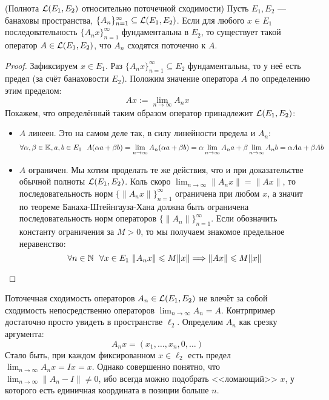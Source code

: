 \begin{theorem} (Полнота $\mathcal{L}(E_1, E_2)$ относительно поточечной сходимости)
	Пусть $E_1, E_2$ --- банаховы пространства, $\{A_n\}_{n = 1}^\infty \subseteq \mathcal{L}(E_1, E_2)$. Если для любого $x \in E_1$ последовательность $\{A_nx\}_{n = 1}^\infty$ фундаментальна в $E_2$, то существует такой оператор $A \in \mathcal{L}(E_1, E_2)$, что $A_n$ сходятся поточечно к $A$.
\end{theorem}

\begin{proof}
	Зафиксируем $x \in E_1$. Раз $\{A_nx\}_{n = 1}^\infty \subseteq E_2$ фундаментальна, то у неё есть предел (за счёт банаховости $E_2$). Положим значение оператора $A$ по определению этим пределом:
	\[
		Ax := \lim_{n \to \infty} A_nx
	\]
	Покажем, что определённый таким образом оператор принадлежит $\mathcal{L}(E_1, E_2)$:
	\begin{itemize}
		\item $A$ линеен. Это на самом деле так, в силу линейности предела и $A_n$:
		\[
			\forall \alpha, \beta \in \K, a, b \in E_1\ \ A(\alpha a + \beta b) = \lim_{n \to \infty} A_n(\alpha a + \beta b) = \alpha \lim_{n \to \infty} A_na + \beta \lim_{n \to \infty} A_nb = \alpha Aa + \beta Ab
		\]
		
		\item $A$ ограничен. Мы хотим проделать те же действия, что и при доказательстве обычной полноты $\mathcal{L}(E_1, E_2)$. Коль скоро $\lim_{n \to \infty} \|A_nx\| = \|Ax\|$, то последовательность норм $\{\|A_nx\|\}_{n = 1}^\infty$ ограничена при любом $x$, а значит по теореме Банаха-Штейнгауза-Хана должна быть ограничена последовательность норм операторов $\{\|A_n\|\}_{n = 1}^\infty$. Если обозначить константу ограничения за $M > 0$, то мы получаем знакомое предельное неравенство:
		\[
			\forall n \in \mathbb{N}\ \ \forall x \in E_1\ \|A_nx\| \leqslant M\|x\| \Longrightarrow \|Ax\| \leqslant M\|x\|
		\]
	\end{itemize}
\end{proof}

\begin{note}
	Поточечная сходимость операторов $A_n \in \mathcal{L}(E_1, E_2)$ не влечёт за собой сходимость непосредственно операторов $\lim_{n \to \infty} A_n = A$. Контрпример достаточно просто увидеть в пространстве $\ell_2$. Определим $A_n$ как срезку аргумента:
	\[
		A_nx = (x_1, \ldots, x_n, 0, \ldots)
	\]
	Стало быть, при каждом фиксированном $x \in \ell_2$ есть предел $\lim_{n \to \infty} A_nx = Ix = x$. Однако совершенно понятно, что $\lim_{n \to \infty} \|A_n - I\| \neq 0$, ибо всегда можно подобрать <<ломающий>> $x$, у которого есть единичная координата в позиции больше $n$.
\end{note}

